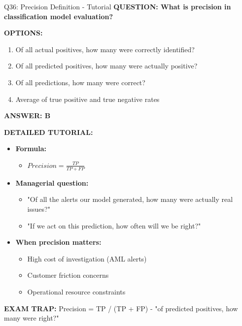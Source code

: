 \documentclass[8pt]{beamer}
\begin{document}
	\begin{frame}{Q36: Precision Definition - Tutorial}
		\fontsize{6.5}{7.5}\selectfont
		\textbf{QUESTION: What is precision in classification model evaluation?}
		
		\vspace{0.1cm}
		\textbf{OPTIONS:}
		\begin{enumerate}
			\item Of all actual positives, how many were correctly identified?
			\item Of all predicted positives, how many were actually positive?
			\item Of all predictions, how many were correct?
			\item Average of true positive and true negative rates
		\end{enumerate}
		
		\vspace{0.1cm}
		\textcolor{myblue}{\textbf{ANSWER: B}}
		
		\vspace{0.1cm}
		\textbf{DETAILED TUTORIAL:}
		\begin{itemize}
			\item \textbf{Formula:}
			\begin{itemize}
				\item $Precision = \frac{TP}{TP + FP}$
			\end{itemize}
			\item \textbf{Managerial question:}
			\begin{itemize}
				\item "Of all the alerts our model generated, how many were actually real issues?"
				\item "If we act on this prediction, how often will we be right?"
			\end{itemize}
			\item \textbf{When precision matters:}
			\begin{itemize}
				\item High cost of investigation (AML alerts)
				\item Customer friction concerns
				\item Operational resource constraints
			\end{itemize}
		\end{itemize}
		
		\textcolor{myred}{\textbf{EXAM TRAP:}} Precision = \textcolor{myblue}{TP / (TP + FP)} - "of predicted positives, how many were right?"
	\end{frame}
	
\end{document}
